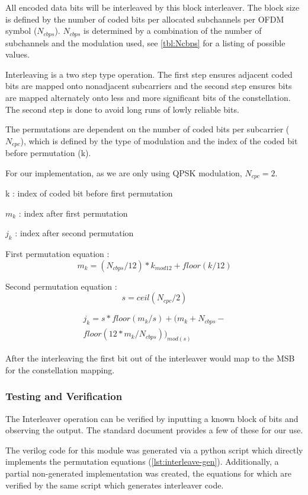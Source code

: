 All encoded data bits will be interleaved by this block interleaver. The
block size is defined by the number of coded bits per allocated subchannels 
per OFDM symbol ($N_{cbps}$). $N_{cbps}$ is determined by a
combination of the number of subchannels and the modulation used, see
\autoref{tbl:Ncbps} for a listing of possible values.

Interleaving is a two step type operation. The first step ensures adjacent 
coded bits are mapped onto nonadjacent subcarriers and the second step 
ensures bits are mapped alternately onto less and more significant bits of
the constellation. The second step is done to avoid long runs of lowly
reliable bits.
 
The permutations are dependent on the number of coded bits per subcarrier
($N_{cpc}$), which is defined by the type of modulation and the index of the
coded bit before permutation (k).

For our implementation, as we are only using QPSK modulation,
$N_{cpc} = 2$.

k : index of coded bit before first permutation

$m_{k}$ : index after first permutation

$j_{k}$ : index after second permutation 

First permutation equation :
\begin{equation}
m_k = (N_{cbps}/12)*k_{mod12}+floor(k/12)
\end{equation}

Second permutation equation :
\begin{equation}
s=ceil(N_{cpc}/2)
\end{equation}

\begin{eqnarray}
j_k = s*floor(m_{k}/s)+(m_{k}+N_{cbps}- \nonumber \\
	floor(12*m_k/N_{cbps}))_{mod(s)}
\end{eqnarray}

After the interleaving the first bit out of the interleaver would map to the
MSB for the constellation mapping. 

	\subsubsection{Testing and Verification}
	The Interleaver operation can be verified by inputting a known block
	of bits and observing the output. The standard document provides a few of these for our use.

	The verilog code for this module was generated via a python script which directly implements the permutation equations (\autoref{lst:interleave-gen}). Additionally, a partial non-generated implementation was created, the equations for which are verified by the same script which generates interleaver code.

